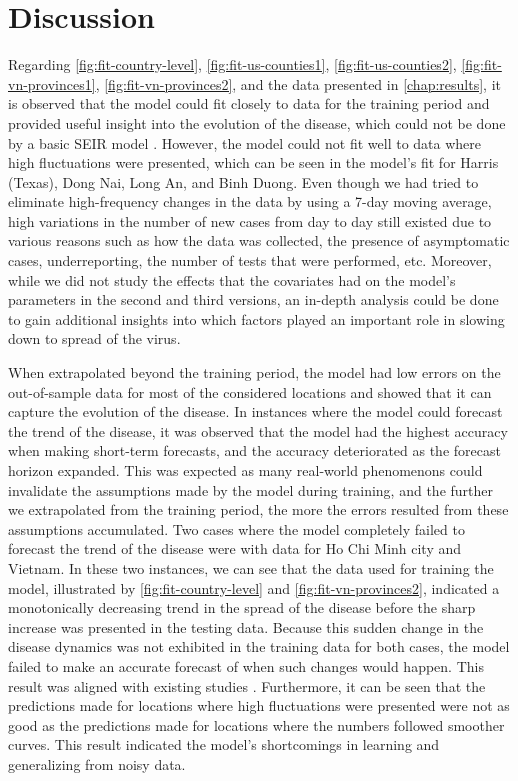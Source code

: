 \chapter{Discussion}
\label{chap:discussion}

Regarding \autoref{fig:fit-country-level}, \autoref{fig:fit-us-counties1}, \autoref{fig:fit-us-counties2}, \autoref{fig:fit-vn-provinces1}, \autoref{fig:fit-vn-provinces2}, and the data presented in \autoref{chap:results}, it is observed that the model could fit closely to data for the training period and provided useful insight into the evolution of the disease, which could not be done by a basic \gls{SEIR} model \cite{dandekarMachineLearningAidedGlobal2020a}.
However, the model could not fit well to data where high fluctuations were presented, which can be seen in the model's fit for Harris (Texas), Dong Nai, Long An, and Binh Duong.
Even though we had tried to eliminate high-frequency changes in the data by using a 7-day moving average, high variations in the number of new cases from day to day still existed due to various reasons such as how the data was collected, the presence of asymptomatic cases, underreporting, the number of tests that were performed, etc.
Moreover, while we did not study the effects that the covariates had on the model's parameters in the second and third versions, an in-depth analysis could be done to gain additional insights into which factors played an important role in slowing down to spread of the virus.

When extrapolated beyond the training period, the model had low errors on the out-of-sample data for most of the considered locations and showed that it can capture the evolution of the disease.
In instances where the model could forecast the trend of the disease, it was observed that the model had the highest accuracy when making short-term forecasts, and the accuracy deteriorated as the forecast horizon expanded.
This was expected as many real-world phenomenons could invalidate the assumptions made by the model during training, and the further we extrapolated from the training period, the more the errors resulted from these assumptions accumulated.
Two cases where the model completely failed to forecast the trend of the disease were with data for Ho Chi Minh city and Vietnam.
In these two instances, we can see that the data used for training the model, illustrated by \autoref{fig:fit-country-level} and \autoref{fig:fit-vn-provinces2}, indicated a monotonically decreasing trend in the spread of the disease before the sharp increase was presented in the testing data.
Because this sudden change in the disease dynamics was not exhibited in the training data for both cases, the model failed to make an accurate forecast of when such changes would happen.
This result was aligned with existing studies \cite{arikInterpretableSequenceLearning}.
Furthermore, it can be seen that the predictions made for locations where high fluctuations were presented were not as good as the predictions made for locations where the numbers followed smoother curves.
This result indicated the model's shortcomings in learning and generalizing from noisy data.

